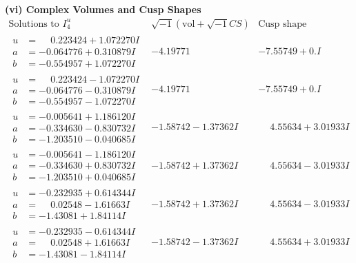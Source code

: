 \documentclass[1p]{elsarticle_modified}
\theoremstyle{definition}
\newcommand{\I}{\sqrt{-1}}
\begin{document}
\newpage\flushleft \textbf{(vi) Complex Volumes and Cusp Shapes}
$$\begin{array}{c|c|c}  
\text{Solutions to }I^u_{4}& \I (\text{vol} + \sqrt{-1}CS) & \text{Cusp shape}\\
 \hline 
\begin{aligned}
u &= \phantom{-}0.223424 + 1.072270 I \\
a &= -0.064776 + 0.310879 I \\
b &= -0.554957 + 1.072270 I\end{aligned}
 & -4.19771\phantom{ +0.000000I} & -7.55749 + 0. I\phantom{ +0.000000I} \\ \hline\begin{aligned}
u &= \phantom{-}0.223424 - 1.072270 I \\
a &= -0.064776 - 0.310879 I \\
b &= -0.554957 - 1.072270 I\end{aligned}
 & -4.19771\phantom{ +0.000000I} & -7.55749 + 0. I\phantom{ +0.000000I} \\ \hline\begin{aligned}
u &= -0.005641 + 1.186120 I \\
a &= -0.334630 - 0.830732 I \\
b &= -1.203510 - 0.040685 I\end{aligned}
 & -1.58742 - 1.37362 I & \phantom{-}4.55634 + 3.01933 I \\ \hline\begin{aligned}
u &= -0.005641 - 1.186120 I \\
a &= -0.334630 + 0.830732 I \\
b &= -1.203510 + 0.040685 I\end{aligned}
 & -1.58742 + 1.37362 I & \phantom{-}4.55634 - 3.01933 I \\ \hline\begin{aligned}
u &= -0.232935 + 0.614344 I \\
a &= \phantom{-}0.02548 - 1.61663 I \\
b &= -1.43081 + 1.84114 I\end{aligned}
 & -1.58742 + 1.37362 I & \phantom{-}4.55634 - 3.01933 I \\ \hline\begin{aligned}
u &= -0.232935 - 0.614344 I \\
a &= \phantom{-}0.02548 + 1.61663 I \\
b &= -1.43081 - 1.84114 I\end{aligned}
 & -1.58742 - 1.37362 I & \phantom{-}4.55634 + 3.01933 I \\ \hline\begin{aligned}

\end{aligned}
\end{array}$$
\end{document}
